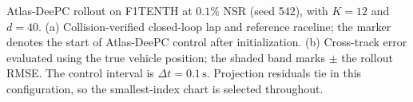 \caption{Atlas-DeePC rollout on F1TENTH at $0.1\%$ NSR (seed 542), with $K=12$ and $d=40$. (a) Collision-verified closed-loop lap and reference raceline; the marker denotes the start of Atlas-DeePC control after initialization. (b) Cross-track error evaluated using the true vehicle position; the shaded band marks $\pm$ the rollout RMSE. The control interval is $\Delta t=0.1\,\mathrm{s}$. Projection residuals tie in this configuration, so the smallest-index chart is selected throughout.}
